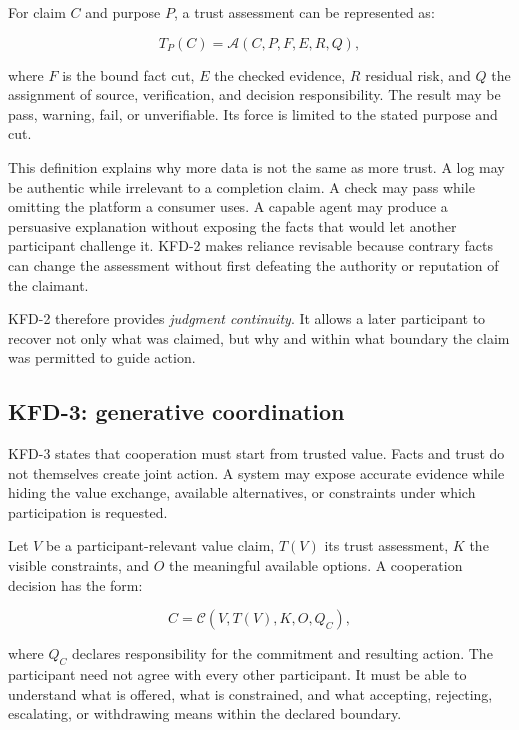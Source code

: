 For claim $C$ and purpose $P$, a trust assessment can be represented as:

\begin{equation}
T_P(C)=\mathcal{A}(C,P,F,E,R,Q),
\label{eq:trust-assessment}
\end{equation}

where $F$ is the bound fact cut, $E$ the checked evidence, $R$ residual risk,
and $Q$ the assignment of source, verification, and decision responsibility.
The result may be pass, warning, fail, or unverifiable. Its force is limited to
the stated purpose and cut.

This definition explains why more data is not the same as more trust. A log
may be authentic while irrelevant to a completion claim. A check may pass
while omitting the platform a consumer uses. A capable agent may produce a
persuasive explanation without exposing the facts that would let another
participant challenge it. KFD-2 makes reliance revisable because contrary
facts can change the assessment without first defeating the authority or
reputation of the claimant.

KFD-2 therefore provides \emph{judgment continuity}. It allows a later
participant to recover not only what was claimed, but why and within what
boundary the claim was permitted to guide action.

\subsection{KFD-3: generative coordination}

KFD-3 states that cooperation must start from trusted value. Facts and trust
do not themselves create joint action. A system may expose accurate evidence
while hiding the value exchange, available alternatives, or constraints under
which participation is requested.

Let $V$ be a participant-relevant value claim, $T(V)$ its trust assessment,
$K$ the visible constraints, and $O$ the meaningful available options. A
cooperation decision has the form:

\begin{equation}
C = \mathcal{C}(V,T(V),K,O,Q_C),
\label{eq:cooperation}
\end{equation}

where $Q_C$ declares responsibility for the commitment and resulting action.
The participant need not agree with every other participant. It must be able
to understand what is offered, what is constrained, and what accepting,
rejecting, escalating, or withdrawing means within the declared boundary.

